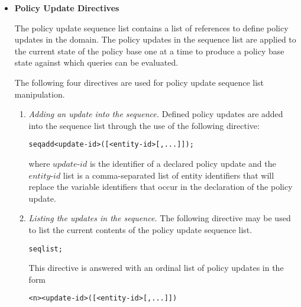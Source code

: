 \documentclass[11pt]{report}
\newenvironment{vverbatim}
{
  \begin{alltt}
}
{
    \vspace{-\baselineskip}
  \end{alltt}
}
\begin{document}
          \begin{itemize}

            \item
              {\bf Policy Update Directives}

              The policy update sequence list contains a list of references to
              define policy updates in the domain. The policy updates in the
              sequence list are applied to the current state of the policy
              base one at a time to produce a policy base state against which
              queries can be evaluated.

              The following four directives are used for policy update
              sequence list manipulation.

              \begin{enumerate}
                \item
                  {\em Adding an update into the sequence.}
                  Defined policy updates are added into the sequence list
                  through the use of the following directive:

                  \begin{vverbatim}
  seq add <update-id>([<entity-id>[, ...]]);
                  \end{vverbatim}

                  \noindent where $update$-$id$ is the identifier of a declared
                  policy update and the $entity$-$id$ list is a comma-separated
                  list of entity identifiers that will replace the variable
                  identifiers that occur in the declaration of the policy
                  update.

                \item
                  {\em Listing the updates in the sequence.}
                  The following directive may be used to list the current
                  contents of the policy update sequence list.

                  \begin{vverbatim}
  seq list;
                  \end{vverbatim}

                  This directive is answered with an ordinal list of policy
                  updates in the form

                  \begin{vverbatim}
  <n> <update-id>([<entity-id>[, ...]])
                  \end{vverbatim}


\end{enumerate}
\end{itemize}
\end{document}

